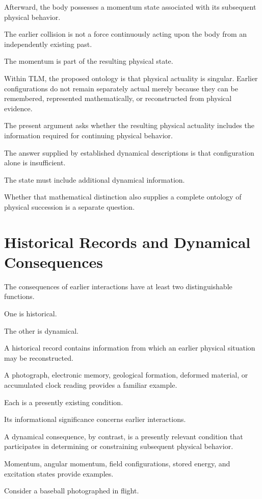 \documentclass[12pt,onecolumn]{article}
\begin{document}
Afterward, the body possesses a momentum state associated with its subsequent physical behavior.

The earlier collision is not a force continuously acting upon the body from an independently existing past.

The momentum is part of the resulting physical state.

Within TLM, the proposed ontology is that physical actuality is singular. Earlier configurations do not remain separately actual merely because they can be remembered, represented mathematically, or reconstructed from physical evidence.

The present argument asks whether the resulting physical actuality includes the information required for continuing physical behavior.

The answer supplied by established dynamical descriptions is that configuration alone is insufficient.

The state must include additional dynamical information.

Whether that mathematical distinction also supplies a complete ontology of physical succession is a separate question.


\section{Historical Records and Dynamical Consequences}

The consequences of earlier interactions have at least two distinguishable functions.

One is historical.

The other is dynamical.

A historical record contains information from which an earlier physical situation may be reconstructed.

A photograph, electronic memory, geological formation, deformed material, or accumulated clock reading provides a familiar example.

Each is a presently existing condition.

Its informational significance concerns earlier interactions.

A dynamical consequence, by contrast, is a presently relevant condition that participates in determining or constraining subsequent physical behavior.

Momentum, angular momentum, field configurations, stored energy, and excitation states provide examples.

Consider a baseball photographed in flight.
\end{document}
